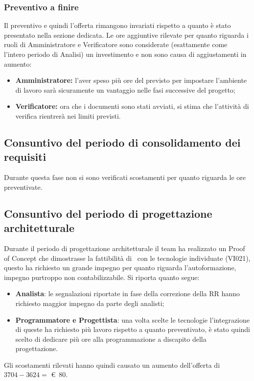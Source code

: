 \subsubsection{Preventivo a finire}
Il preventivo e quindi l'offerta rimangono invariati rispetto a quanto è stato presentato nella sezione dedicata. Le ore aggiuntive rilevate per quanto riguarda i ruoli di Amministratore e Verificatore sono considerate (esattamente come l'intero periodo di Analisi) un investimento e non sono causa di aggiustamenti in aumento: 
\begin{itemize}
    \item \textbf{Amministratore:} l'aver speso più ore del previsto per impostare l'ambiente di lavoro sarà sicuramente un vantaggio nelle fasi successive del progetto;
    \item \textbf{Verificatore:} ora che i documenti sono stati avviati, si stima che l'attività di verifica rientrerà nei limiti previsti.
\end{itemize}

\subsection{Consuntivo del periodo di consolidamento dei requisiti}
Durante questa fase non si sono verificati scostamenti per quanto riguarda le ore preventivate. 

\subsection{Consuntivo del periodo di progettazione architetturale}
Durante il periodo di progettazione architetturale il team ha realizzato un Proof of Concept che dimostrasse la fattibilità di \hd\ con le tecnologie individuate (VI021), questo ha richiesto un grande impegno per quanto riguarda l'autoformazione, impegno purtroppo non contabilizzabile. 
Si riporta quanto segue:
\begin{itemize}
    \item \textbf{Analista}: le segnalazioni riportate in fase della correzione della RR hanno richiesto maggior impegno da parte degli analisti;
    \item \textbf{Programmatore e Progettista}: una volta scelte le tecnologie l'integrazione di queste ha richiesto più lavoro rispetto a quanto preventivato, è stato quindi scelto di dedicare più ore alla programmazione a discapito della progettazione.
\end{itemize}
\def\salarycontent{
    {Amministratore,13,20,260},
    {Analista,$26+\noexpand\textbf{6}$,25,800},
    {Progettista,$62-\noexpand\textbf{10}$,22,1144},
    {Programmatore,41,15,615},
    {Responsabile,9,30,270},
    {Verificatore,41,15,615},
    {Totale,188,127,3704},
}

\noindent Gli scostamenti rilevati hanno quindi causato un aumento dell'offerta di $3704 - 3624 =$ \euro\ 80.

